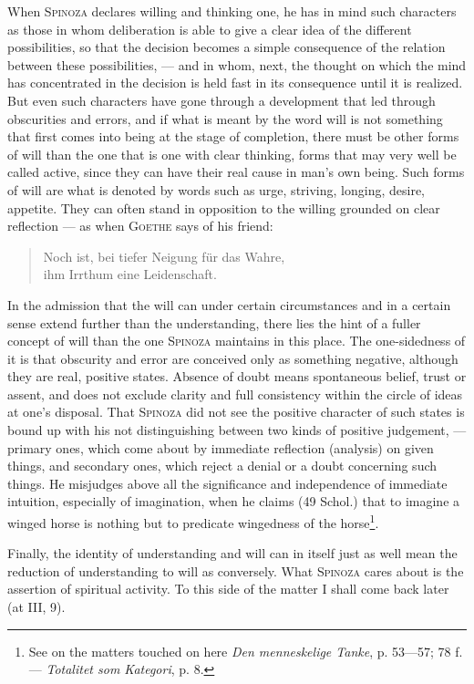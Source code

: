 \documentclass[12pt]{article}
\newcommand{\opage}[1]{\marginnote{\footnotesize\textit{[#1]}}}
\begin{document}
When \textsc{Spinoza} declares willing and thinking one, he has in mind such characters as
those in whom deliberation is able to give a clear idea of the different possibilities, so
that the decision becomes a simple consequence of the relation between these possibilities,
--- and in whom, next, the thought on which the mind has concentrated in the decision is held
fast in its consequence until it is realized. But even such characters have gone through a
development that led through obscurities and errors, and if what is meant by the word will is
not something that first comes into being at the stage of completion, there must be other
forms of will than the one that is one with clear thinking, forms that may very well be called
active, since they can have their real cause in man's own being. Such forms of will are what is
denoted by words such as urge, striving, longing, desire, appetite. They can often stand in
opposition to the willing grounded on clear reflection --- as when \textsc{Goethe} says of his
friend:

\begin{quote}
Noch ist, bei tiefer Neigung für das Wahre,\\
ihm Irrthum eine Leidenschaft.
\end{quote}

In the admission that the will can under certain circumstances and in a certain sense extend
further than the understanding, there lies the hint of a fuller concept of will than the one
\textsc{Spinoza} maintains in this place. The one-sidedness of it is that obscurity and error
are conceived only as something negative, although they are real, positive states. Absence of
doubt means spontaneous belief, trust or assent, and does not exclude clarity and full
consistency within the circle of ideas at one's disposal. That \textsc{Spinoza} did not see
the positive character of such states is bound up with his not distinguishing between two
kinds of positive judgement, --- primary ones, which come about by immediate reflection
(analysis) on given things, and secondary ones, which reject a denial or a doubt concerning
such things. \opage{56}He misjudges above all the significance and independence of immediate
intuition, especially of imagination, when he claims (49 Schol.) that to imagine a winged horse
is nothing but to predicate wingedness of the horse\footnote{See on the matters touched on
here \textit{Den menneskelige Tanke}, p. 53---57; 78 f. --- \textit{Totalitet som
Kategori}, p. 8.}.

Finally, the identity of understanding and will can in itself just as well mean the reduction
of understanding to will as conversely. What \textsc{Spinoza} cares about is the assertion of
spiritual activity. To this side of the matter I shall come back later (at III, 9).
\end{document}
